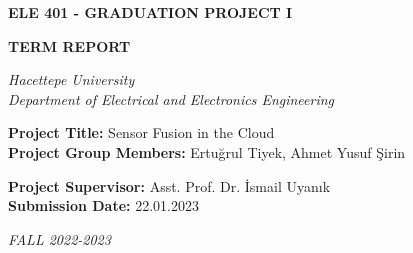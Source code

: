 \documentclass[12pt]{article}
\begin{document}
\begin{titlepage}
    \begin{center}
        \LARGE
        \textbf{ELE 401 - GRADUATION PROJECT I}

        \Large
        \textbf{TERM REPORT}

        \vspace{70pt}

        \textit{
            Hacettepe University \\
            Department of Electrical and Electronics Engineering
        }
    \end{center}

    \vspace{90pt}

    \large

    \textbf{Project Title:} Sensor Fusion in the Cloud \\

    \textbf{Project Group Members:} Ertuğrul Tiyek, Ahmet Yusuf Şirin

    \vspace{30pt}

    \textbf{Project Supervisor:} Asst. Prof. Dr. İsmail Uyanık \\

    \textbf{Submission Date:} 22.01.2023

    \vspace{\fill}

    \begin{center}
        \textit{FALL 2022-2023}
    \end{center}
\end{titlepage}

\clearpage

\tableofcontents
\listoffigures
\listoftables

\clearpage
\end{document}
